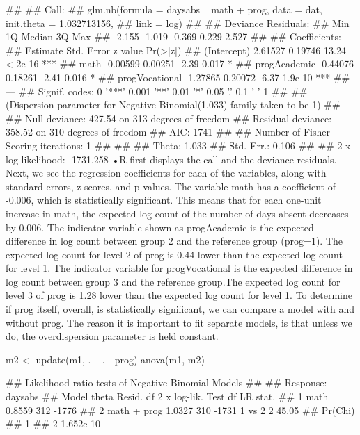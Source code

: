 ## 
## Call:
## glm.nb(formula = daysabs ~ math + prog, data = dat, init.theta = 1.032713156, 
##     link = log)
## 
## Deviance Residuals: 
##    Min      1Q  Median      3Q     Max  
## -2.155  -1.019  -0.369   0.229   2.527  
## 
## Coefficients:
##                Estimate Std. Error z value Pr(>|z|)    
## (Intercept)     2.61527    0.19746   13.24  < 2e-16 ***
## math           -0.00599    0.00251   -2.39    0.017 *  
## progAcademic   -0.44076    0.18261   -2.41    0.016 *  
## progVocational -1.27865    0.20072   -6.37  1.9e-10 ***
## ---
## Signif. codes:  0 '***' 0.001 '**' 0.01 '*' 0.05 '.' 0.1 ' ' 1
## 
## (Dispersion parameter for Negative Binomial(1.033) family taken to be 1)
## 
##     Null deviance: 427.54  on 313  degrees of freedom
## Residual deviance: 358.52  on 310  degrees of freedom
## AIC: 1741
## 
## Number of Fisher Scoring iterations: 1
## 
## 
##               Theta:  1.033 
##           Std. Err.:  0.106 
## 
##  2 x log-likelihood:  -1731.258
•R first displays the call and the deviance residuals. Next, we see the regression coefficients for each of the variables, along with standard errors, z-scores, and p-values. The variable math has a coefficient of -0.006, which is statistically significant. This means that for each one-unit increase in math, the expected log count of the number of days absent decreases by 0.006. The indicator variable shown as progAcademic is the expected difference in log count between group 2 and the reference group (prog=1). The expected log count for level 2 of prog is 0.44 lower than the expected log count for level 1. The indicator variable for progVocational is the expected difference in log count between group 3 and the reference group.The expected log count for level 3 of prog is 1.28 lower than the expected log count for level 1. To determine if prog itself, overall, is statistically significant, we can compare a model with and without prog. The reason it is important to fit separate models, is that unless we do, the overdispersion parameter is held constant.



m2 <- update(m1, . ~ . - prog)
anova(m1, m2)

## Likelihood ratio tests of Negative Binomial Models
## 
## Response: daysabs
##         Model  theta Resid. df    2 x log-lik.   Test    df LR stat.
## 1        math 0.8559       312           -1776                      
## 2 math + prog 1.0327       310           -1731 1 vs 2     2    45.05
##     Pr(Chi)
## 1          
## 2 1.652e-10

